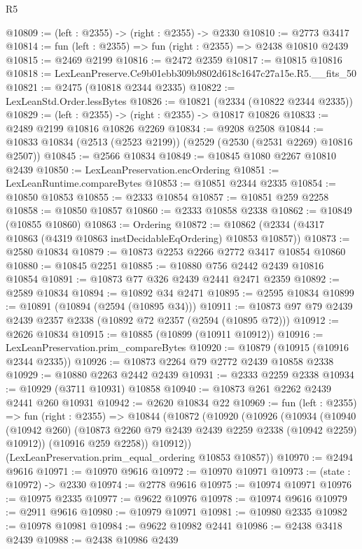 \begin{lexlean}{R5}
\begin{coremodule}
@10809 := (left : @2355) -> (right : @2355) -> @2330
@10810 := @2773 @3417
@10814 := fun (left : @2355) => fun (right : @2355) => @2438 @10810 @2439
@10815 := @2469 @2199
@10816 := @2472 @2359
@10817 := @10815 @10816
@10818 := LexLeanPreserve.Ce9b01ebb309b9802d618c1647c27a15e.R5.__fits_50
@10821 := @2475 (@10818 @2344 @2335)
@10822 := LexLeanStd.Order.lessBytes
@10826 := @10821 (@2334 (@10822 @2344 @2335))
@10829 := (left : @2355) -> (right : @2355) -> @10817 @10826
@10833 := @2489 @2199 @10816 @10826 @2269
@10834 := @9208 @2508
@10844 := @10833 @10834 (@2513 (@2523 @2199)) (@2529 (@2530 (@2531 @2269) @10816 @2507))
@10845 := @2566 @10834
@10849 := @10845 @1080 @2267 @10810 @2439
@10850 := LexLeanPreservation.encOrdering
@10851 := LexLeanRuntime.compareBytes
@10853 := @10851 @2344 @2335
@10854 := @10850 @10853
@10855 := @2333 @10854
@10857 := @10851 @259 @2258
@10858 := @10850 @10857
@10860 := @2333 @10858 @2338
@10862 := @10849 (@10855 @10860)
@10863 := Ordering
@10872 := @10862 (@2334 (@4317 @10863 (@4319 @10863 instDecidableEqOrdering) @10853 @10857))
@10873 := @2580 @10834
@10879 := @10873 @2253 @2266 @2772 @3417 @10854 @10860
@10880 := @10845 @2251
@10885 := @10880 @756 @2442 @2439 @10816 @10854
@10891 := @10873 @77 @326 @2439 @2441 @2471 @2359
@10892 := @2589 @10834
@10894 := @10892 @34 @2471
@10895 := @2595 @10834
@10899 := @10891 (@10894 (@2594 (@10895 @34)))
@10911 := @10873 @97 @79 @2439 @2439 @2357 @2338 (@10892 @72 @2357 (@2594 (@10895 @72)))
@10912 := @2626 @10834
@10915 := @10885 (@10899 (@10911 @10912))
@10916 := LexLeanPreservation.prim_compareBytes
@10920 := @10879 (@10915 (@10916 @2344 @2335))
@10926 := @10873 @2264 @79 @2772 @2439 @10858 @2338
@10929 := @10880 @2263 @2442 @2439
@10931 := @2333 @2259 @2338
@10934 := @10929 (@3711 @10931) @10858
@10940 := @10873 @261 @2262 @2439 @2441 @260 @10931
@10942 := @2620 @10834 @22
@10969 := fun (left : @2355) =>
  fun (right : @2355) =>
  @10844
    (@10872
      (@10920
        (@10926
          (@10934
            (@10940 (@10942 @260) (@10873 @2260 @79 @2439 @2439 @2259 @2338 (@10942 @2259) @10912))
            (@10916 @259 @2258))
          @10912))
      (LexLeanPreservation.prim_equal_ordering @10853 @10857))
@10970 := @2494 @9616
@10971 := @10970 @9616
@10972 := @10970 @10971
@10973 := (state : @10972) -> @2330
@10974 := @2778 @9616
@10975 := @10974 @10971
@10976 := @10975 @2335
@10977 := @9622 @10976
@10978 := @10974 @9616
@10979 := @2911 @9616
@10980 := @10979 @10971
@10981 := @10980 @2335
@10982 := @10978 @10981
@10984 := @9622 @10982 @2441
@10986 := @2438 @3418 @2439
@10988 := @2438 @10986 @2439

\end{coremodule}
\end{lexlean}
